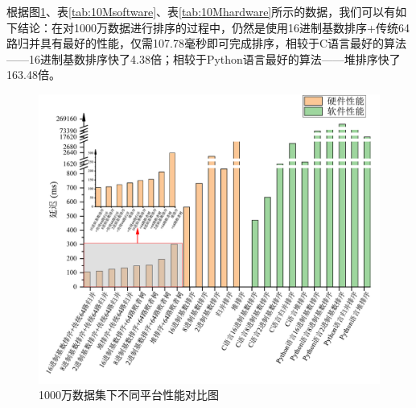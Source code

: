 
根据图\ref{fig:10MComparison}、表\ref{tab:10Msoftware}、表\ref{tab:10Mhardware}所示的数据，我们可以有如下结论：在对1000万数据进行排序的过程中，仍然是使用16进制基数排序+传统64路归并具有最好的性能，仅需107.78毫秒即可完成排序，相较于C语言最好的算法——16进制基数排序快了4.38倍；相较于Python语言最好的算法——堆排序快了163.48倍。

\begin{figure}[htbp]
    \centering
    \includegraphics[width=\linewidth]{figures/10MComparison.pdf}
    \caption{1000万数据集下不同平台性能对比图}
    \label{fig:10MComparison}
\end{figure}

\begin{table}[htbp]
\centering
\caption{1000万级别数据集软件性能测试}
\label{tab:10Msoftware}
\end{table}




